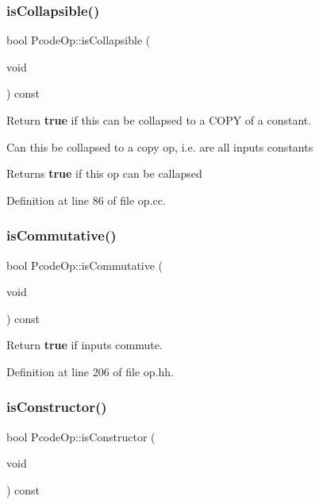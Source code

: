 \subsubsection{\texorpdfstring{isCollapsible()}{isCollapsible()}}
{\footnotesize\ttfamily bool Pcode\+Op\+::is\+Collapsible (\begin{DoxyParamCaption}\item[{void}]{ }\end{DoxyParamCaption}) const}



Return {\bfseries{true}} if this can be collapsed to a C\+O\+PY of a constant. 

Can this be collapsed to a copy op, i.\+e. are all inputs constants \begin{DoxyReturn}{Returns}
{\bfseries{true}} if this op can be callapsed 
\end{DoxyReturn}


Definition at line 86 of file op.\+cc.

\mbox{\label{class_pcode_op_ab71ae5150df21c23ffcc6638d925d224}} 
\subsubsection{\texorpdfstring{isCommutative()}{isCommutative()}}
{\footnotesize\ttfamily bool Pcode\+Op\+::is\+Commutative (\begin{DoxyParamCaption}\item[{void}]{ }\end{DoxyParamCaption}) const\hspace{0.3cm}{\ttfamily [inline]}}



Return {\bfseries{true}} if inputs commute. 



Definition at line 206 of file op.\+hh.

\mbox{\label{class_pcode_op_a3e4c697ce7f00268e011b74ab5d2cdb4}} 
\subsubsection{\texorpdfstring{isConstructor()}{isConstructor()}}
{\footnotesize\ttfamily bool Pcode\+Op\+::is\+Constructor (\begin{DoxyParamCaption}\item[{void}]{ }\end{DoxyParamCaption}) const\hspace{0.3cm}{\ttfamily [inline]}}



